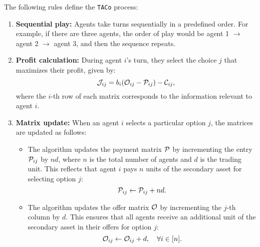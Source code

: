 The following rules define the \texttt{TACo} process:

\begin{enumerate}[\hspace{1pt}1)]
    \item \textbf{Sequential play:} Agents take turns sequentially in a predefined order. For example, if there are three agents, the order of play would be agent 1 $\rightarrow$ agent 2 $\rightarrow$ agent 3, and then the sequence repeats.
    
    \item \textbf{Profit calculation:} During agent $i$'s turn, they select the choice $j$ that maximizes their profit, given by:
    \begin{equation} \label{eq:profUpdate}
    \mathcal{J}_{ij} = b_i (\mathcal{O}_{ij} - \mathcal{P}_{ij}) - \mathcal{C}_{ij},
    \end{equation}
    where the $i$-th row of each matrix corresponds to the information relevant to agent $i$. 
    
    \item \textbf{Matrix update:} When an agent $ i $ selects a particular option $ j $, the matrices are updated as follows:

\begin{itemize} \setlength{\itemindent}{-0.8em}
    \item The algorithm updates the payment matrix $\mathcal{P}$ by incrementing the entry $\mathcal{P}_{ij}$ by $ nd $, where $ n $ is the total number of agents and $ d $ is the trading unit. This reflects that agent $ i $ pays $ n $ units of the secondary asset for selecting option $ j $:
    \begin{equation} \label{eq:payUpdate}
        \mathcal{P}_{ij} \gets \mathcal{P}_{ij} + nd.    
    \end{equation}
    \item The algorithm updates the offer matrix $\mathcal{O}$ by incrementing the $ j $-th column by $ d $. This ensures that all agents receive an additional unit of the secondary asset in their offers for option $ j $:
    \begin{equation} \label{eq:offerUpdate}
        \mathcal{O}_{ij} \gets \mathcal{O}_{ij} + d, \quad \forall i \in [n].    
    \end{equation}
\end{itemize}


\end{enumerate}
